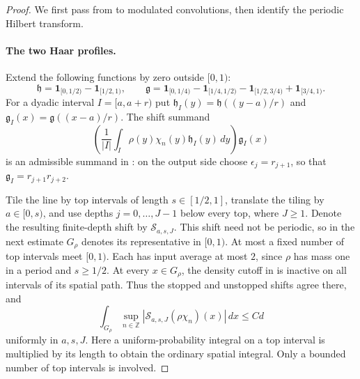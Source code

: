 \begin{proof}
We first pass from  to modulated convolutions, then
identify the periodic Hilbert transform.

\paragraph{The two Haar profiles.}
Extend the following functions by zero outside $[0,1)$:
\[
 \mathfrak h
 =\mathbf1_{[0,1/2)}-\mathbf1_{[1/2,1)},\qquad
 \mathfrak g
 =\mathbf1_{[0,1/4)}-\mathbf1_{[1/4,1/2)}
  -\mathbf1_{[1/2,3/4)}+\mathbf1_{[3/4,1)}.
\]
For a dyadic interval $I=[a,a+r)$ put
$\mathfrak h_I(y)=\mathfrak h((y-a)/r)$ and
$\mathfrak g_I(x)=\mathfrak g((x-a)/r)$.
The shift summand
\[
 \left(\frac1{|I|}\int_I \rho(y)\chi_n(y)\mathfrak h_I(y)\,dy\right)
                \mathfrak g_I(x)
\]
is an admissible summand in : on the output side choose
$\epsilon_j=r_{j+1}$, so that
$\mathfrak g_I=r_{j+1}r_{j+2}$.

Tile the line by top intervals of length $s\in[1/2,1]$, translate the
tiling by $a\in[0,s)$, and use depths $j=0,\ldots,J-1$ below every top,
where $J\ge1$. Denote the resulting finite-depth shift by
$\mathcal S_{a,s,J}$. This shift need not be periodic, so in the next
estimate $G_\rho$ denotes its representative in $[0,1)$.
At most a fixed number of top intervals meet $[0,1)$.
Each has input average at most $2$, since $\rho$ has mass
one in a period and $s\ge1/2$. At every $x\in G_\rho$, the density cutoff
in  is inactive on all intervals of its spatial path.
Thus the stopped and unstopped shifts agree there, and
\begin{equation}\label{eq:fourier-finite-shift}
 \int_{G_\rho}\sup_{n\in\mathbb Z}
             |\mathcal S_{a,s,J}(\rho\chi_n)(x)|\,dx\le Cd
\end{equation}
uniformly in $a,s,J$.
Here a uniform-probability integral on a top interval is multiplied by
its length to obtain the ordinary spatial integral. Only a bounded
number of top intervals is involved.


\end{proof}
